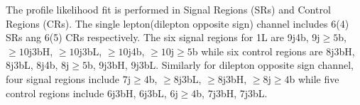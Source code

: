 The profile likelihood fit is performed in Signal Regions (SRs) and Control Regions (CRs). The single lepton(dilepton opposite sign) channel includes 6(4) SRs ang 6(5) CRs respectively.  The six signal regions for 1L are 9j4b, 9j$\ge5$b, $\ge10$j3bH, $\ge10$j3bL, $\ge10$j4b, $\ge10$j$\ge5$b while six control regions are 8j3bH, 8j3bL, 8j4b, 8j$\ge5$b, 9j3bH, 9j3bL. Similarly for dilepton opposite sign channel, four signal regions include 7j$\ge4$b, $\ge8$j3bL, $\ge8$j3bH, $\ge8$j$\ge4$b while five control regions include 6j3bH, 6j3bL, 6j$\ge4$b, 7j3bH, 7j3bL.





